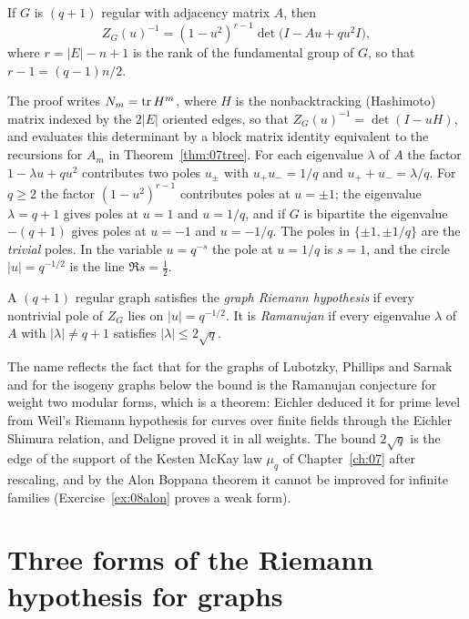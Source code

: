 \begin{theorem}
If $G$ is $(q+1)$ regular with adjacency matrix $A$, then
\[
Z_G(u)^{-1}=(1-u^2)^{r-1}\det\bigl(I-Au+qu^2I\bigr),
\]
where $r=|E|-n+1$ is the rank of the fundamental group of $G$, so that $r-1=(q-1)n/2$.
\end{theorem}

The proof writes $N_m=\operatorname{tr} H^m$, where $H$ is the nonbacktracking (Hashimoto) matrix indexed by the $2|E|$ oriented edges, so that $Z_G(u)^{-1}=\det(I-uH)$, and evaluates this determinant by a block matrix identity equivalent to the recursions for $A_m$ in Theorem~\ref{thm:07tree}. For each eigenvalue $\lambda$ of $A$ the factor $1-\lambda u+qu^2$ contributes two poles $u_\pm$ with $u_+u_-=1/q$ and $u_++u_-=\lambda/q$. For $q\ge2$ the factor $(1-u^2)^{r-1}$ contributes poles at $u=\pm1$; the eigenvalue $\lambda=q+1$ gives poles at $u=1$ and $u=1/q$, and if $G$ is bipartite the eigenvalue $-(q+1)$ gives poles at $u=-1$ and $u=-1/q$. The poles in $\{\pm1,\pm1/q\}$ are the \emph{trivial} poles. In the variable $u=q^{-s}$ the pole at $u=1/q$ is $s=1$, and the circle $|u|=q^{-1/2}$ is the line $\Re s=\tfrac12$.

\begin{definition}
A $(q+1)$ regular graph satisfies the \emph{graph Riemann hypothesis} if every nontrivial pole of $Z_G$ lies on $|u|=q^{-1/2}$. It is \emph{Ramanujan} if every eigenvalue $\lambda$ of $A$ with $|\lambda|\ne q+1$ satisfies $|\lambda|\le2\sqrt q$.
\end{definition}

The name reflects the fact that for the graphs of Lubotzky, Phillips and Sarnak and for the isogeny graphs below the bound is the Ramanujan conjecture for weight two modular forms, which is a theorem: Eichler \cite{eichler1954} deduced it for prime level from Weil's Riemann hypothesis for curves over finite fields through the Eichler Shimura relation, and Deligne \cite{deligne1974} proved it in all weights. The bound $2\sqrt q$ is the edge of the support of the Kesten McKay law $\mu_q$ of Chapter~\ref{ch:07} after rescaling, and by the Alon Boppana theorem it cannot be improved for infinite families \cite{nilli1991} (Exercise~\ref{ex:08alon} proves a weak form).

\section{Three forms of the Riemann hypothesis for graphs}

